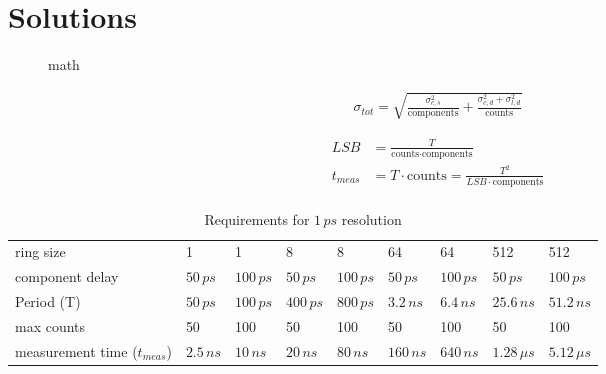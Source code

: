 \section*{Solutions}


\begin{figure}[H]
\centering
{}
\caption{math}
\label{tkz:math}
\end{figure}


\begin{align*}
\sigma_{tot} = \sqrt{\frac{\sigma_{c,s}^2}{\text{components}}+\frac{\sigma_{c,d}^2+\sigma_{l,d}^2}{\text{counts}}}
\end{align*}

\begin{align*}
LSB &= \frac{T}{\text{counts}\cdot \text{components}}\\
t_{meas} &= T\cdot \text{counts} = \frac{T^2}{LSB\cdot\text{components}}\\
\end{align*}

\begin{table}[H]
\centering
\caption{Requirements for $1\,ps$ resolution}
\label{my-label}
\begin{tabular}{|l|ll|ll|ll|ll|} \hline
ring size                     & 1         & 1         & 8         & 8         & 64          & 64          & 512           & 512        \\
component delay               & $50\,ps$  & $100\,ps$ & $50\,ps$  & $100\,ps$ & $50\,ps$    & $100\,ps$   & $50\,ps$      & $100\,ps$  \\ \hline
Period (T)                    & $50\,ps$  & $100\,ps$ & $400\,ps$ & $800\,ps$ & $3.2\,ns$   & $6.4\,ns$   & $25.6\,ns$    & $51.2\,ns$ \\
max counts                    & 50        & 100       & 50        & 100       & 50          & 100         & 50            & 100      \\
measurement time ($t_{meas}$) & $2.5\,ns$ & $10\,ns$  & $20\,ns$  & $80\,ns$  & $160\,ns$   & $640\,ns$   & $1.28\,\mu s$ & $5.12\,\mu s$  \\ \hline
\end{tabular}
\end{table}

